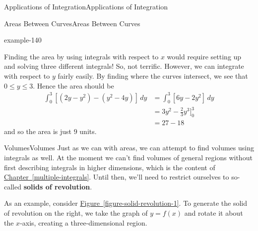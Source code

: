 \documentclass[10pt,]{book}
\newcommand{\terminology}[1]{\textbf{#1}}
\numberwithin{equation}{section}
\newcommand{\amp}{&}
\begin{document}
\begin{chapterptx}{Applications of Integration}{}{Applications of Integration}{}{}
\begin{sectionptx}{Areas Between Curves}{}{Areas Between Curves}{}{}
\begin{example}{}{example-140}
\begin{figure}
{
}
\end{figure}
\hypertarget{p-626}{}%
Finding the area by using integrals with respect to \(x\) would require setting up and solving three different integrals! So, not terrific. However, we can integrate with respect to \(y\) fairly easily. By finding where the curves intersect, we see that \(0\leq y\leq 3\). Hence the area should be%
\begin{align*}
\int_{0}^{3}[(2y - y^{2}) - (y^{2} - 4y)]\,dy \amp = \int_{0}^{3}[6y - 2y^{2}]\,dy \\
\amp = 3y^{2} - \frac{2}{3}y^{3}\Bigg]_{0}^{3} \\
\amp = 27 - 18 
\end{align*}
and so the area is just \(9\) units.%
\end{example}
\end{sectionptx}
%
%
\typeout{************************************************}
\typeout{************************************************}
%
\begin{sectionptx}{Volumes}{}{Volumes}{}{}\label{section-volumes}
\hypertarget{p-627}{}%
Just as we can with areas, we can attempt to find volumes using integrals as well. At the moment we can't find volumes of general regions without first describing integrals in higher dimensions, which is the content of \hyperref[multiple-integrals]{Chapter~\ref{multiple-integrals}}. Until then, we'll need to restrict ourselves to so-called \terminology{solids of revolution}.%
\par
\hypertarget{p-628}{}%
As an example, consider \hyperref[figure-solid-revolution-1]{Figure~\ref{figure-solid-revolution-1}}. To generate the solid of revolution on the right, we take the graph of \(y = f(x)\) and rotate it about the \(x\)-axis, creating a three-dimensional region.%
\begin{figure}
\centering
\leavevmode%
\begin{sidebyside}{2}{0}{0}{0}%
\begin{sbspanel}{0.5}%
\end{sbspanel}
\end{sidebyside}
\end{figure}
\end{sectionptx}
\end{chapterptx}
\end{document}

